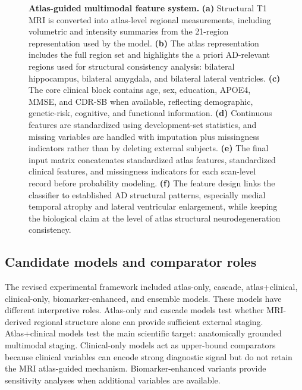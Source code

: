 \documentclass[12pt,a4paper]{article}
\begin{document}
\begin{figure}[p]
    \centering
    \caption{\textbf{Atlas-guided multimodal feature system.} \textbf{(a)} Structural T1 MRI is converted into atlas-level regional measurements, including volumetric and intensity summaries from the 21-region representation used by the model. \textbf{(b)} The atlas representation includes the full region set and highlights the a priori AD-relevant regions used for structural consistency analysis: bilateral hippocampus, bilateral amygdala, and bilateral lateral ventricles. \textbf{(c)} The core clinical block contains age, sex, education, APOE4, MMSE, and CDR-SB when available, reflecting demographic, genetic-risk, cognitive, and functional information. \textbf{(d)} Continuous features are standardized using development-set statistics, and missing variables are handled with imputation plus missingness indicators rather than by deleting external subjects. \textbf{(e)} The final input matrix concatenates standardized atlas features, standardized clinical features, and missingness indicators for each scan-level record before probability modeling. \textbf{(f)} The feature design links the classifier to established AD structural patterns, especially medial temporal atrophy and lateral ventricular enlargement, while keeping the biological claim at the level of atlas structural neurodegeneration consistency.}
    \label{fig:v6_features}
\end{figure}

\subsection{Candidate models and comparator roles}
\label{sec:candidates}

The revised experimental framework included atlas-only, cascade, atlas+clinical, clinical-only, biomarker-enhanced, and ensemble models. These models have different interpretive roles. Atlas-only and cascade models test whether MRI-derived regional structure alone can provide sufficient external staging. Atlas+clinical models test the main scientific target: anatomically grounded multimodal staging. Clinical-only models act as upper-bound comparators because clinical variables can encode strong diagnostic signal but do not retain the MRI atlas-guided mechanism. Biomarker-enhanced variants provide sensitivity analyses when additional variables are available.
\end{document}

